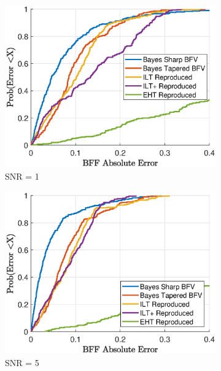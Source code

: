 \begin{figure}[htb!]
    \centering
    \begin{subfigure}[b]{0.49\textwidth}
        \includegraphics[width = \textwidth]{evaluation/cdf_SNR_1.eps}
        \caption{SNR = 1}
    \end{subfigure}
    \begin{subfigure}[b]{0.49\textwidth}
        \includegraphics[width = \textwidth]{evaluation/cdf_SNR_5.eps}
        \caption{SNR = 5}
    \end{subfigure}
    \begin{subfigure}[b]{0.49\textwidth}

\end{subfigure}
\end{figure}

